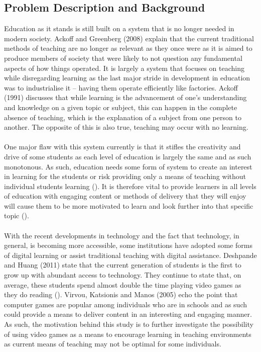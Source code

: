 \subsection{Problem Description and Background}
Education as it stands is still built on a system that is no longer needed in modern society. Ackoff and Greenberg (2008) explain that the current traditional methods of teaching are no longer as relevant as they once were as it is aimed to produce members of society that were likely to not question any fundamental aspects of how things operated. It is largely a system that focuses on teaching while disregarding learning as the last major stride in development in education was to industrialise it – having them operate efficiently like factories. Ackoff (1991) discusses that while learning is the advancement of one’s understanding and knowledge on a given topic or subject, this can happen in the complete absence of teaching, which is the explanation of a subject from one person to another. The opposite of this is also true, teaching may occur with no learning.
\\\\
One major flaw with this system currently is that it stifles the creativity and drive of some students as each level of education is largely the same and as such monotonous. As such, education needs some form of system to create an interest in learning for the students or risk providing only a means of teaching without individual students learning (\cite{Ackoff2008}). It is therefore vital to provide learners in all levels of education with engaging content or methods of delivery that they will enjoy will cause them to be more motivated to learn and look further into that specific topic (\cite{Ackoff2008}). 
\\\\
With the recent developments in technology and the fact that technology, in general, is becoming more accessible, some institutions have adopted some forms of digital learning or assist traditional teaching with digital assistance. Deshpande and Huang (2011) state that the current generation of students is the first to grow up with abundant access to technology. They continue to state that, on average, these students spend almost double the time playing video games as they do reading (\cite{Deshpande2011}). Virvou, Katsionis and Manos (2005) echo the point that computer games are popular among individuals who are in schools and as such could provide a means to deliver content in an interesting and engaging manner. As such, the motivation behind this study is to further investigate the possibility of using video games as a means to encourage learning in teaching environments as current means of teaching may not be optimal for some individuals. 

